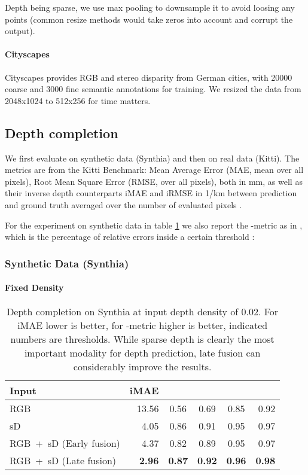 \documentclass[10pt,twocolumn,letterpaper]{article}
\begin{document}
Depth being sparse, we use max pooling to downsample it to avoid loosing any points (common resize methods would take zeros into account and corrupt the output).
\paragraph{Cityscapes}
Cityscapes \cite{Cordts2016Cityscapes} provides RGB and stereo disparity from German cities, with 20000 coarse and 3000 fine semantic annotations for training. We resized the data from 2048x1024 to 512x256 for time matters.

\subsection{Depth completion}
\label{sec:depthCompletion}

We first evaluate on synthetic data (Synthia) and then on real data (Kitti). The metrics are from the Kitti Benchmark: Mean Average Error (MAE,  mean over all pixels),  Root Mean Square Error (RMSE,  over all pixels), both in mm, as well as their inverse depth counterparts iMAE and iRMSE in 1/km between prediction  and ground truth  averaged over the number of evaluated pixels . 

For the experiment on synthetic data in table \ref{tab:depthCompletionSynthetic} we also report the -metric as in \cite{eigen2014depth}, which is the percentage of relative errors inside a certain threshold :


\subsubsection{Synthetic Data (Synthia)}\label{sec:expDepthSynthia}
\paragraph{Fixed Density}


\begin{table}
	\scriptsize
	\centering
	\begin{tabular}{lrcccr}  
		\toprule
		Input & iMAE &  &  &  &  \\
		\midrule
		RGB & 13.56 & 0.56 & 0.69 & 0.85 & 0.92 \\
		sD & 4.05 & 0.86 & 0.91 & 0.95 & 0.97 \\
		RGB~+~sD (Early fusion) & 4.37 & 0.82 & 0.89 & 0.95 & 0.97 \\
		RGB~+~sD (Late fusion) & \textbf{2.96} & \textbf{0.87} & \textbf{0.92} & \textbf{0.96} & \textbf{0.98} \\
		\bottomrule
	\end{tabular}
	\caption{Depth completion on Synthia at input depth density of 0.02. For iMAE lower is better, for -metric higher is better, indicated numbers are thresholds. While sparse depth is clearly the most important modality for depth prediction, late fusion can considerably improve the results.}
	\label{tab:depthCompletionSynthetic}
\end{table}
\end{document}
